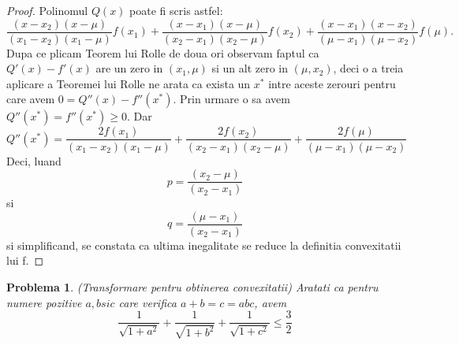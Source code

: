 \documentclass[a4paper,12pt,oneside]{report}
\newtheorem{problem}{Problema}
\begin{document}
\begin{proof}
Polinomul \(Q\left ( x \right )\) poate fi scris astfel:
\begin{displaymath}
  \frac{\left ( x - x_{2} \right )\left ( x - \mu  \right )}{\left ( x_{1}  - x_{2}\right )\left ( x_{1} - \mu  \right )} f\left ( x_{1} \right ) + \frac{\left ( x - x_{1} \right )\left ( x - \mu  \right )}{\left ( x_{2}  - x_{1}\right )\left ( x_{2} - \mu  \right )}  f\left ( x_{2} \right ) +  \frac{\left ( x - x_{1} \right )\left ( x - x_{2}  \right )}{\left ( \mu   - x_{1}\right )\left (  \mu - x_{2} \right )}f\left ( \mu \right ).
\end{displaymath}
Dupa ce plicam Teorem lui Rolle de doua ori observam faptul ca  \({Q}'\left ( x \right ) - {f}'\left ( x \right )\) are un zero in \(\left ( x_{1} , \mu \right )\) si un alt zero in \(\left ( \mu  , x_{2} \right )\), deci o a treia aplicare a Teoremei lui Rolle ne arata ca exista un \(x^{*}\) intre aceste zerouri pentru care avem \(0 = {Q}''\left ( x \right ) - {f}''\left ( x^{*} \right )\). Prin urmare o sa avem \({Q}''\left ( x^{*}  \right ) = {f}''\left ( x^{*} \right )\geq 0\). Dar
\begin{displaymath}
  {Q}''\left ( x^{*}  \right ) = \frac{2f\left ( x_{1} \right )}{\left ( x_{1} - x_{2} \right )\left ( x_{1} - \mu  \right )} +  \frac{2f\left ( x_{2} \right )}{\left ( x_{2} - x_{1} \right )\left ( x_{2} - \mu  \right )} +  \frac{2f\left (\mu  \right )}{\left ( \mu  - x_{1} \right )\left ( \mu  - x_{2} \right )}
\end{displaymath}
Deci, luand
\begin{displaymath}
  p = \frac{\left ( x_{2} - \mu  \right )}{\left ( x_{2} - x_{1}\right )}
\end{displaymath}
si
\begin{displaymath}
  q = \frac{\left ( \mu  - x_{1} \right )}{\left ( x_{2} - x_{1} \right )}
\end{displaymath}
si simplificand, se constata ca ultima inegalitate se reduce la definitia convexitatii lui f.
\end{proof}
\begin{problem} (Transformare pentru obtinerea convexitatii)
Aratati ca pentru numere pozitive \(a , b si c\) care verifica \(a + b = c = abc\), avem
\begin{displaymath}
  \frac{1}{\sqrt{1 + a^{2}}} + \frac{1}{\sqrt{1 + b^{2}}} + \frac{1}{\sqrt{1 + c^{2}}} \leq \frac{3}{2}
\end{displaymath}
\end{problem}
\end{document}

